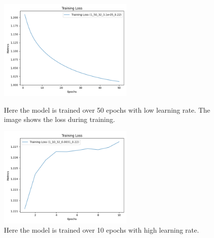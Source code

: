 \documentclass{article}
\begin{document}
\begin{figure}[H]
    \centering
    \begin{minipage}[b]{0.45\textwidth}
        \centering
        \includegraphics[width=\textwidth, height=5cm]{imgs/long_train_loss.png}
        \caption{Here the model is trained over 50 epochs with low learning rate. The image shows the loss during training. }
        \label{fig:LongTrainLoss}
    \end{minipage}
    \hfill
    \begin{minipage}[b]{0.45\textwidth}
        \centering
        \includegraphics[width=\textwidth, height=5cm]{imgs/short_train_loss.png}
        \caption{Here the model is trained over 10 epochs with high learning rate.}
        \label{fig:ShortTrainLoss}
    \end{minipage}
\end{figure}
\end{document}
